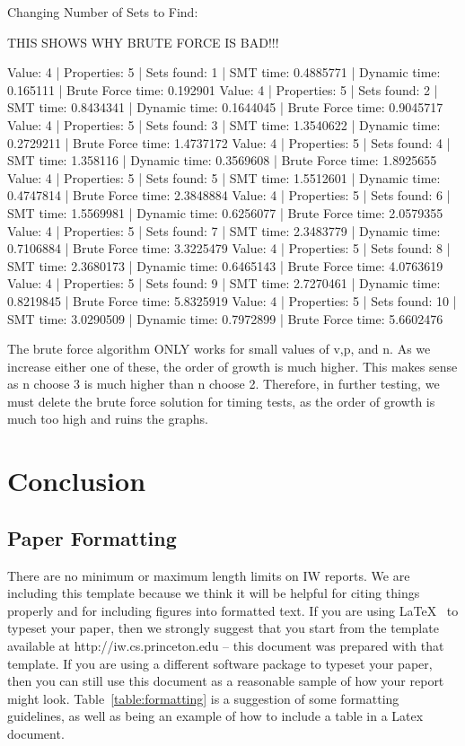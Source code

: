 \documentclass[pageno]{jpaper}
\begin{document}
Changing Number of Sets to Find:

THIS SHOWS WHY BRUTE FORCE IS BAD!!!

Value: 4 | Properties: 5 | Sets found: 1 | SMT time: 0.4885771 | Dynamic time: 0.165111 | Brute Force time: 0.192901
Value: 4 | Properties: 5 | Sets found: 2 | SMT time: 0.8434341 | Dynamic time: 0.1644045 | Brute Force time: 0.9045717
Value: 4 | Properties: 5 | Sets found: 3 | SMT time: 1.3540622 | Dynamic time: 0.2729211 | Brute Force time: 1.4737172
Value: 4 | Properties: 5 | Sets found: 4 | SMT time: 1.358116 | Dynamic time: 0.3569608 | Brute Force time: 1.8925655
Value: 4 | Properties: 5 | Sets found: 5 | SMT time: 1.5512601 | Dynamic time: 0.4747814 | Brute Force time: 2.3848884
Value: 4 | Properties: 5 | Sets found: 6 | SMT time: 1.5569981 | Dynamic time: 0.6256077 | Brute Force time: 2.0579355
Value: 4 | Properties: 5 | Sets found: 7 | SMT time: 2.3483779 | Dynamic time: 0.7106884 | Brute Force time: 3.3225479
Value: 4 | Properties: 5 | Sets found: 8 | SMT time: 2.3680173 | Dynamic time: 0.6465143 | Brute Force time: 4.0763619
Value: 4 | Properties: 5 | Sets found: 9 | SMT time: 2.7270461 | Dynamic time: 0.8219845 | Brute Force time: 5.8325919
Value: 4 | Properties: 5 | Sets found: 10 | SMT time: 3.0290509 | Dynamic time: 0.7972899 | Brute Force time: 5.6602476






The brute force algorithm ONLY works for small values of v,p, and n. As we increase either one of these, the order of growth is much higher. This makes sense as n choose 3 is much higher than n choose 2. Therefore, in further testing, we must delete the brute force solution for timing tests, as the order of growth is much too high and ruins the graphs. 

\section{Conclusion}










\subsection{Paper Formatting}
\label{section:formatting}

There are no minimum or maximum length limits on IW reports.  
We are including this template because we think it will be helpful
for citing things properly and for including figures into formatted
text.  If you are using \LaTeX~\cite{lamport94} 
to typeset your paper, then we strongly suggest
that you start from the template available at
http://iw.cs.princeton.edu -- this
document was prepared with that template.  
If you are using a different software package to typeset your paper, 
then you can still use this document as a reasonable sample of 
how your report might look.  Table~\ref{table:formatting} is a suggestion
of some formatting guidelines, as well as being an example of how to
include a table in a Latex document.
\end{document}
